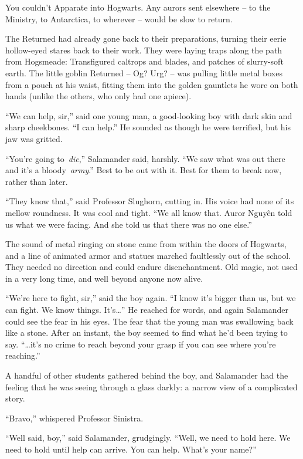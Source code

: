 You couldn't Apparate into Hogwarts. Any aurors sent elsewhere -- to the
Ministry, to Antarctica, to wherever -- would be slow to return.

The Returned had already gone back to their preparations, turning their
eerie hollow-eyed stares back to their work. They were laying traps
along the path from Hogsmeade: Transfigured caltrops and blades, and
patches of slurry-soft earth. The little goblin Returned -- Og? Urg? --
was pulling little metal boxes from a pouch at his waist, fitting them
into the golden gauntlets he wore on both hands (unlike the others, who
only had one apiece).

``We can help, sir,'' said one young man, a good-looking boy with dark
skin and sharp cheekbones. ``I can help.'' He sounded as though he were
terrified, but his jaw was gritted.

``You're going to~\emph{die},'' Salamander said, harshly. ``We saw what
was out there and it's a bloody~\emph{army}.'' Best to be out with it.
Best for them to break now, rather than later.

``They know that,'' said Professor Slughorn, cutting in. His voice had
none of its mellow roundness. It was cool and tight. ``We all know that.
Auror Nguy\makebox[0pt][l]{\raisebox{0.5ex}{˜}}ên told us what we were
facing. And she told us that there was no one else.''

The sound of metal ringing on stone came from within the doors of
Hogwarts, and a line of animated armor and statues marched faultlessly
out of the school. They needed no direction and could endure
disenchantment. Old magic, not used in a very long time, and well beyond
anyone now alive.

``We're here to fight, sir,'' said the boy again. ``I know it's bigger
than us, but we can fight. We know things. It's\ldots{}'' He reached for
words, and again Salamander could see the fear in his eyes. The fear
that the young man was swallowing back like a stone. After an instant,
the boy seemed to find what he'd been trying to say. ``\ldots it's no
crime to reach beyond your grasp if you can see where you're reaching.''

A handful of other students gathered behind the boy, and Salamander had
the feeling that he was seeing through a glass darkly: a narrow view of
a complicated story.

``Bravo,'' whispered Professor Sinistra.

``Well said, boy,'' said Salamander, grudgingly. ``Well, we need to hold
here. We need to hold until help can arrive. You can help. What's your
name?''

